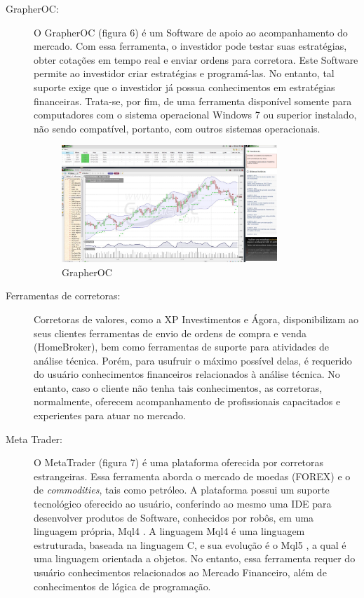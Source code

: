\begin{description}
\item[GrapherOC:]

O GrapherOC (figura 6) é um Software de apoio ao acompanhamento do mercado. Com essa ferramenta, o investidor pode testar suas estratégias, obter cotações em tempo real e enviar ordens para corretora. Este Software permite ao investidor criar estratégias e programá-las. No entanto, tal suporte exige que o investidor já possua conhecimentos em estratégias financeiras. Trata-se, por fim, de uma ferramenta disponível somente para computadores com o sistema operacional Windows 7 \textregistered   ou superior instalado, não sendo compatível, portanto, com outros sistemas operacionais.


\begin{figure}[h!]
\centering
\label{f03}
\includegraphics[width=0.8\textwidth]{figuras/f03}
\caption{GrapherOC}

\end{figure}
\FloatBarrier

\item[Ferramentas de corretoras:]

Corretoras de valores, como a XP Investimentos e Ágora, disponibilizam ao seus clientes ferramentas de envio de ordens de compra e venda (HomeBroker), bem como ferramentas de suporte para atividades de análise técnica. Porém, para usufruir o máximo possível delas, é requerido do usuário conhecimentos financeiros relacionados à análise técnica. No entanto, caso o cliente não tenha tais conhecimentos, as corretoras, normalmente, oferecem acompanhamento de profissionais capacitados e experientes para atuar no mercado.

\item[Meta Trader:]

O MetaTrader (figura 7) é uma plataforma oferecida por corretoras estrangeiras. Essa ferramenta aborda o mercado de moedas (FOREX) e o de \textit{commodities}, tais como petróleo. A plataforma possui um suporte tecnológico oferecido ao usuário, conferindo ao mesmo uma IDE para desenvolver produtos de Software, conhecidos por robôs, em uma linguagem própria, Mql4 \cite{kovalyov2006}. A linguagem Mql4 é uma linguagem estruturada, baseada na linguagem C, e sua evolução é o Mql5 \cite{metaquotes2014}, a qual é uma linguagem orientada a objetos. No entanto, essa ferramenta requer do usuário conhecimentos relacionados ao Mercado Financeiro, além de conhecimentos de lógica de programação.


\end{description}
